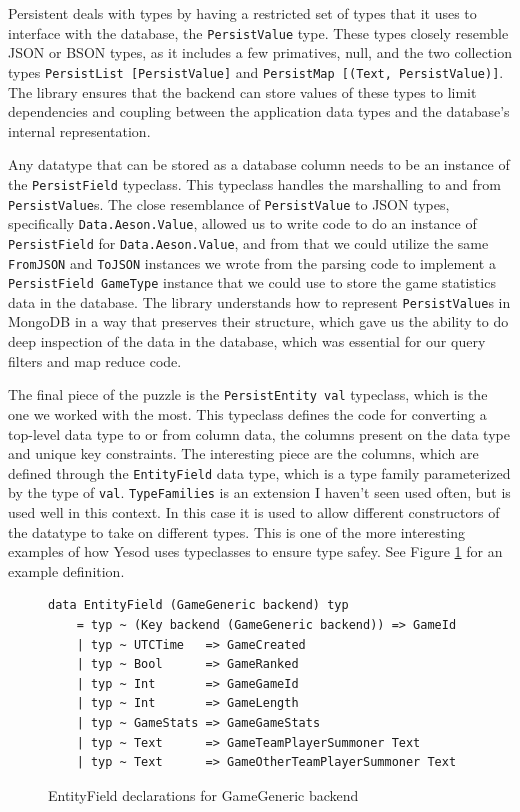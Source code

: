 \documentclass[letterpaper,twocolumn,9pt]{article}
\newcommand{\code}[1]{\texttt{#1}}
\begin{document}
Persistent deals with types by having a restricted set of types that it uses to interface with the database, the \code{PersistValue} type.  These types closely resemble JSON or BSON types, as it includes a few primatives, null, and the two collection types \code{PersistList [PersistValue]} and \code{PersistMap [(Text, PersistValue)]}.  The library ensures that the backend can store values of these types to limit dependencies and coupling between the application data types and the database's internal representation.

Any datatype that can be stored as a database column needs to be an instance of the \code{PersistField} typeclass.  This typeclass handles the marshalling to and from \code{PersistValue}s.  The close resemblance of \code{PersistValue} to JSON types, specifically \code{Data.Aeson.Value}, allowed us to write code to do an instance of \code{PersistField} for \code{Data.Aeson.Value}, and from that we could utilize the same \code{FromJSON} and \code{ToJSON} instances we wrote from the parsing code to implement a \code{PersistField GameType} instance that we could use to store the game statistics data in the database.  The library understands how to represent \code{PersistValue}s in MongoDB in a way that preserves their structure, which gave us the ability to do deep inspection of the data in the database, which was essential for our query filters and map reduce code.

The final piece of the puzzle is the \code{PersistEntity val} typeclass, which is the one we worked with the most.  This typeclass defines the code for converting a top-level data type to or from column data, the columns present on the data type and unique key constraints.  The interesting piece are the columns, which are defined through the \code{EntityField} data type, which is a type family parameterized by the type of \code{val}.  \code{TypeFamilies} is an extension I haven't seen used often, but is used well in this context.  In this case it is used to allow different constructors of the datatype to take on different types.  This is one of the more interesting examples of how Yesod uses typeclasses to ensure type safey.  See Figure \ref{EntityField} for an example definition.

\begin{figure}[]
\footnotesize{
\begin{verbatim}
data EntityField (GameGeneric backend) typ
    = typ ~ (Key backend (GameGeneric backend)) => GameId
    | typ ~ UTCTime   => GameCreated
    | typ ~ Bool      => GameRanked
    | typ ~ Int       => GameGameId
    | typ ~ Int       => GameLength
    | typ ~ GameStats => GameGameStats
    | typ ~ Text      => GameTeamPlayerSummoner Text
    | typ ~ Text      => GameOtherTeamPlayerSummoner Text
\end{verbatim}
}
    \caption{EntityField declarations for GameGeneric backend}
    \label{EntityField}
\end{figure}
\end{document}

